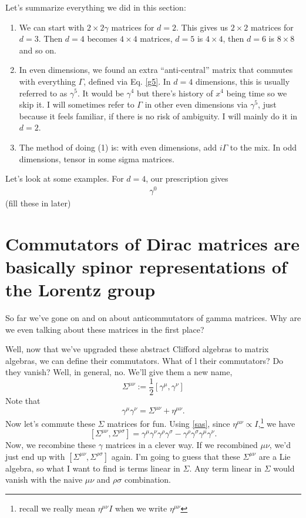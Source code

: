 \documentclass[main.tex]{subfiles}
\begin{document}
Let's summarize everything we did in this section:
\begin{enumerate} [(1)]
\item We can start with $2\times 2 \gamma$ matrices for $d=2$. This gives us $2\times 2$ matrices for $d=3$. Then $d=4$ becomes $4\times 4$ matrices, $d=5$ is $4\times 4$, then $d=6$ is $8\times 8$ and so on.

\item In even dimensions, we found an extra ``anti-central'' matrix that commutes with everything $\Gamma$, defined via Eq. \ref{g5}. In $d=4$ dimensions, this is usually referred to as $\gamma^5$. It would be $\gamma^4$ but there's history of $x^4$ being time so we skip it. I will sometimes refer to $\Gamma$ in other even dimensions via $\gamma^5$, just because it feels familiar, if there is no risk of ambiguity. I will mainly do it in $d=2$.

\item The method of doing (1) is: with even dimensions, add $i\Gamma$ to the mix. In odd dimensions, tensor in some sigma matrices.
\end{enumerate}

Let's look at some examples. For $d=4$, our prescription gives
\begin{align*}
\gamma^0 
\end{align*}
(fill these in later)

\section{Commutators of Dirac matrices are basically spinor representations of the Lorentz group}
So far we've gone on and on about anticommutators of gamma matrices. Why are we even talking about these matrices in the first place? 

Well, now that we've upgraded these abstract Clifford algebras to matrix algebras, we can define their commutators. What of l their commutators? Do they vanish? Well, in general, no. We'll give them a new name, 
\[
\Sigma^{\mu \nu} := \frac{1}{2}[\gamma^\mu,\gamma^\nu]  
\]
Note that 
\begin{equation} \label{sas} 
\gamma^\mu \gamma^\nu = \Sigma^{\mu \nu} + \eta^{\mu \nu}.
\end{equation}
Now let's commute these $\Sigma$ matrices for fun. Using \ref{sas}, since $\eta^{\mu \nu} \propto I$,\footnote{recall we really mean $\eta^{\mu \nu} I$ when we write $\eta^{\mu \nu}$} we have
\begin{equation} \label{comcom}
[\Sigma^{\mu \nu},\Sigma^{\rho \sigma}] = \gamma^\mu \gamma^\nu \gamma^\rho \gamma^\sigma - \gamma^\rho \gamma^\sigma \gamma^\mu \gamma^\nu.
\end{equation}
Now, we recombine these $\gamma$ matrices in a clever way. If we recombined $\mu \nu$, we'd just end up with $[\Sigma^{\mu \nu}, \Sigma^{\rho \sigma}]$ again. I'm going to guess that these $\Sigma^{\mu \nu}$ are a Lie algebra, so what I want to find is terms linear in $\Sigma$. Any term linear in $\Sigma$ would vanish with the naive $\mu \nu$ and $\rho \sigma$ combination.
\end{document}
